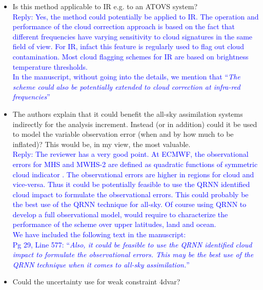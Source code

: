 \documentclass[11pt,a4paper,draft]{article}
\begin{document}
\begin{itemize}
		
\item	
		Is this method applicable to IR e.g. to an ATOVS system?\\
	
\textcolor{blue}{Reply:  Yes, the method could potentially be applied to IR. The operation and  performance of the cloud correction approach is based on the fact that different frequencies have varying sensitivity to cloud signatures in the same field of view. For IR, infact this feature is regularly used to flag out cloud contamination. Most cloud flagging schemes for IR are based on brightness temperature thresholds. \\
In the manuscript, without going into the details, we mention that ``\textit{The scheme could also be potentially extended to cloud correction at infra-red frequencies}''
}\\

\item 		
		The authors explain that it could benefit the all-sky assimilation systems indirectly for
		the analysis increment. Instead (or in addition) could it be used to model the variable
		observation error (when and by how much to be inflated)? This would be, in my view,
		the most valuable.	\\
			
\textcolor{blue}{Reply: The reviewer has a very good point. At ECMWF, the observational errors for MHS and MWHS-2 are defined as quadratic functions of symmetric cloud indicator \citep{geer2015scatteringindex}. The observational errors are higher in regions for cloud and vice-versa. Thus it could be potentially feasible to use the QRNN identified cloud impact to formulate the observational errors.  This could probably be the best use of the QRNN technique for all-sky. Of course using QRNN to develop a full observational model, would require to characterize the performance of the scheme over upper latitudes, land and ocean.\\
We have included the following text in the manuscript:\\
Pg 29, Line 577: ``\textit{Also, it could be feasible to use the QRNN identified cloud impact to formulate the observational errors. This may be the best use of the QRNN technique when it comes to all-sky assimilation.}''}\\
		
\item	Could the uncertainty use for weak constraint 4dvar?\\
		

\end{itemize}
\end{document}
